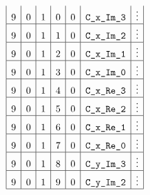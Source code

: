 \begin{figure}[h!]
\begin{adjustwidth}{-2cm}{-2cm}
{\[\begin{array}{|c|c|c|c|c|c|c|}
                               9 & 0      & 1      & 0           & 0         & \texttt{C\_x\_Im\_3}             & \vdots                                                                                                                        \\ \hline
                               9 & 0      & 1      & 1           & 0         & \texttt{C\_x\_Im\_2}               & \vdots                                                                                                                        \\ \hline
                               9 & 0      & 1      & 2           & 0         & \texttt{C\_x\_Im\_1}               & \vdots                                                                                                                        \\ \hline
                               9 & 0      & 1      & 3           & 0         & \texttt{C\_x\_Im\_0}              & \vdots                                                                                                                        \\ \hline
                               9 & 0      & 1      & 4           & 0         & \texttt{C\_x\_Re\_3}             & \vdots                                                                                                                        \\ \hline
                               9 & 0      & 1      & 5           & 0         & \texttt{C\_x\_Re\_2}               & \vdots                                                                                                                        \\ \hline
                               9 & 0      & 1      & 6           & 0         & \texttt{C\_x\_Re\_1}               & \vdots                                                                                                                        \\ \hline
                               9 & 0      & 1      & 7           & 0         & \texttt{C\_x\_Re\_0}              & \vdots                                                                                                                        \\ \hline
                               9 & 0      & 1      & 8           & 0         & \texttt{C\_y\_Im\_3}             & \vdots                                                                                                                        \\ \hline
                               9 & 0      & 1      & 9           & 0         & \texttt{C\_y\_Im\_2}               & \vdots                                                                                                                        \\ \hline

\end{array}\]}
\end{adjustwidth}
\end{figure}
